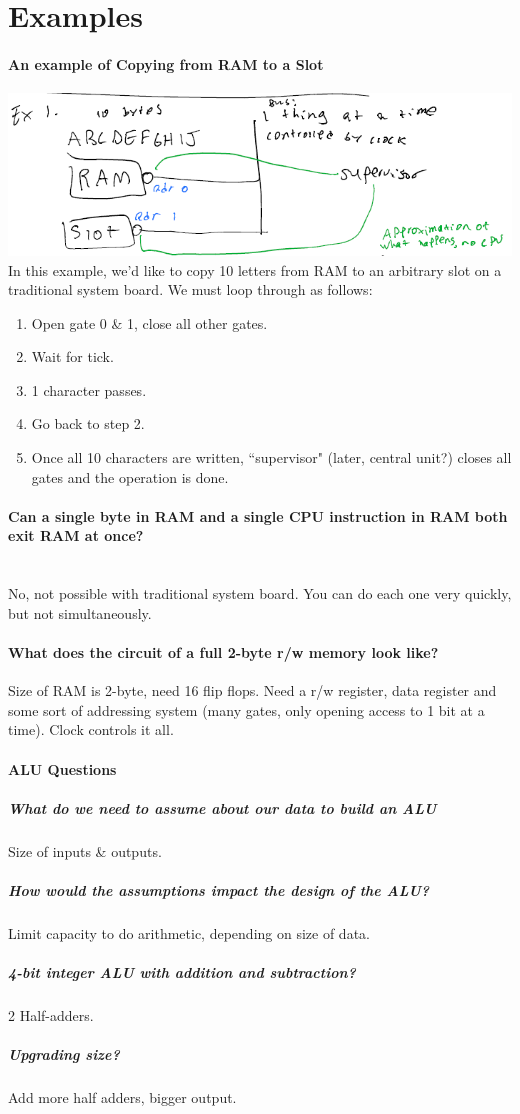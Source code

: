 \documentclass[12 pt]{article}
\begin{document}
	\section{Examples}
	\paragraph{An example of Copying from RAM to a Slot}
	\includegraphics[scale=0.5]{rmstr.png}
	In this example, we'd like to copy 10 letters from RAM to an arbitrary slot on a traditional system board. We must loop through as follows:
	\begin{enumerate}
		\item Open gate 0 \& 1, close all other gates.
		\item Wait for tick.
		\item 1 character passes.
		\item Go back to step 2.
		\item Once all 10 characters are written, ``supervisor" (later, central unit?) closes all gates and the operation is done.
		\end{enumerate}
		\paragraph{Can a single byte in RAM and a single CPU instruction in RAM both exit RAM at once?}
		~\\ No, not possible with traditional system board. You can do each one very quickly, but not simultaneously.
		\paragraph{What does the circuit of a full 2-byte r/w memory look like?}
		Size of RAM is 2-byte, need 16 flip flops. Need a r/w register, data register and some sort of addressing system (many gates, only opening access to 1 bit at a time). Clock controls it all.
		\paragraph{ALU Questions}
		\subparagraph{What do we need to assume about our data to build an ALU}
		Size of inputs \& outputs.
		\subparagraph{How would the assumptions impact the design of the ALU?} Limit capacity to do arithmetic, depending on size of data.
		\subparagraph{4-bit integer ALU with addition and subtraction?} 2 Half-adders.
		\subparagraph{Upgrading size?} Add more half adders, bigger output.
\end{document}
